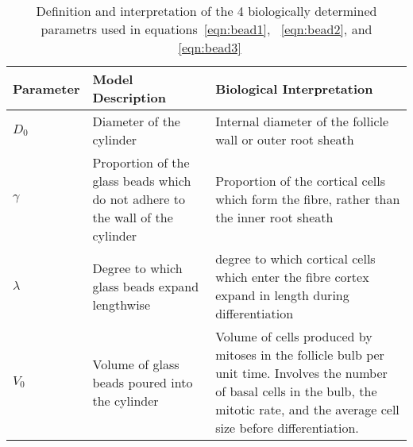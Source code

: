 %

\begin{table}[htp]
\centering
\caption{Definition and interpretation of the 4 biologically determined parametrs used in equations~\ref{eqn:bead1}, ~\ref{eqn:bead2}, and ~\ref{eqn:bead3}}
\label{tab:4param}
\vspace{0.1in}
\begin{tabular}{|p{0.6in}|p{2.0in}|p{2.2in}|}  \hline
     Parameter & Model Description  &  Biological Interpretation  \\ 
\hline 
  $D_{0}$  &  Diameter of the cylinder  &  Internal diameter of the follicle wall or outer root sheath \\
  $\gamma$ &  Proportion of the glass beads which do not adhere to the wall of the cylinder  &  Proportion of the cortical cells which form the fibre, rather than the inner root sheath \\
 $\lambda$ &  Degree to which glass beads expand lengthwise & degree to which cortical cells which enter the fibre cortex expand in length during differentiation \\
 $V_{0}$   &  Volume of glass beads poured into the cylinder & Volume of cells produced by mitoses in the follicle bulb per unit time. Involves the number of basal cells in the bulb, the mitotic rate, and the average cell size before differentiation. \\
\hline

\end{tabular}
\end{table}

%
